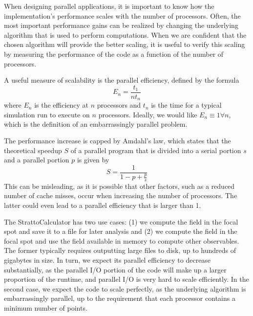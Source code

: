 \documentclass[11pt,SymmetricalJury]{inrsthesis/inrsthesis}
\begin{document}
When designing parallel applications, it is important to know how the implementation's
performance scales with the number of processors. Often, the most important
performance gains can be realized by changing the underlying algorithm that
is used to perform computations. When we are confident that the chosen algorithm
will provide the better scaling, it is useful to verify this scaling by measuring
the performance of the code as a function of the number of processors.

A useful measure of scalability is the parallel efficiency, defined by the
formula
  \begin{equation}
    E_n = \frac{t_1}{nt_n}
  \end{equation}
where $E_n$ is the efficiency at $n$ processors and $t_n$ is the time for a typical
simulation run to execute on $n$ processors. Ideally, we would like
$E_n\equiv1\forall n$, which is the definition of an embarrassingly parallel problem.

The performance increase is capped by Amdahl's law, which states that the
theoretical speedup $S$ of a parallel program that is divided into a serial
portion $s$ and a parallel portion $p$ is given by
  \begin{equation}
    S = \frac{1}{1-p+\frac{p}{s}}
  \end{equation}
This can be misleading, as it is possible that other factors, such as a reduced
number of cache misses, occur when increasing the number of processors. The
latter could even lead to a parallel efficiency that is larger than 1.

The StrattoCalculator has two use cases: (1) we compute the field in the focal
spot and save it to a file for later analysis and (2) we compute the field in
the focal spot and use the field available in memory to compute other
observables. The former typically requires outputting large files to disk, up to
hundreds of gigabytes in size. In turn, we expect its parallel efficiency to
decrease substantially, as the parallel I/O portion of the code will make up a
larger proportion of the runtime, and parallel I/O is very hard to scale
efficiently.  In the second case, we expect the code to scale
perfectly, as the underlying algorithm is embarrassingly parallel, up to the
requirement that each processor contains a minimum number of points.
\end{document}
